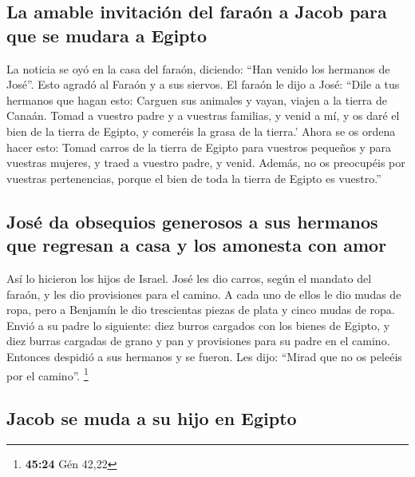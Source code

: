 \hypertarget{la-amable-invitaciuxf3n-del-farauxf3n-a-jacob-para-que-se-mudara-a-egipto}{%
\subsection{La amable invitación del faraón a Jacob para que se mudara a
Egipto}\label{la-amable-invitaciuxf3n-del-farauxf3n-a-jacob-para-que-se-mudara-a-egipto}}

 La noticia se oyó en la casa del faraón, diciendo: ``Han
venido los hermanos de José''. Esto agradó al Faraón y a sus siervos.
 El faraón le dijo a José: ``Dile a tus hermanos que
hagan esto: Carguen sus animales y vayan, viajen a la tierra de Canaán.
 Tomad a vuestro padre y a vuestras familias, y venid a
mí, y os daré el bien de la tierra de Egipto, y comeréis la grasa de la
tierra.'  Ahora se os ordena hacer esto: Tomad carros de
la tierra de Egipto para vuestros pequeños y para vuestras mujeres, y
traed a vuestro padre, y venid.  Además, no os preocupéis
por vuestras pertenencias, porque el bien de toda la tierra de Egipto es
vuestro.''

\hypertarget{josuxe9-da-obsequios-generosos-a-sus-hermanos-que-regresan-a-casa-y-los-amonesta-con-amor}{%
\subsection{José da obsequios generosos a sus hermanos que regresan a
casa y los amonesta con
amor}\label{josuxe9-da-obsequios-generosos-a-sus-hermanos-que-regresan-a-casa-y-los-amonesta-con-amor}}

 Así lo hicieron los hijos de Israel. José les dio
carros, según el mandato del faraón, y les dio provisiones para el
camino.  A cada uno de ellos le dio mudas de ropa, pero a
Benjamín le dio trescientas piezas de plata y cinco mudas de ropa.
 Envió a su padre lo siguiente: diez burros cargados con
los bienes de Egipto, y diez burras cargadas de grano y pan y
provisiones para su padre en el camino.  Entonces
despidió a sus hermanos y se fueron. Les dijo: ``Mirad que no os peleéis
por el camino''. \footnote{\textbf{45:24} Gén 42,22}

\hypertarget{jacob-se-muda-a-su-hijo-en-egipto}{%
\subsection{Jacob se muda a su hijo en
Egipto}\label{jacob-se-muda-a-su-hijo-en-egipto}}

